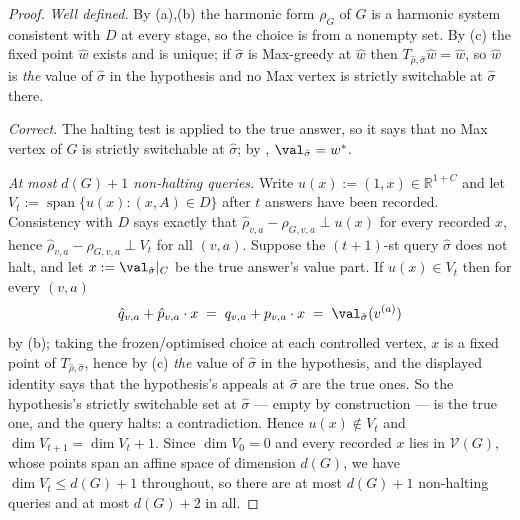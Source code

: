 \begin{proof}
\emph{Well defined.}  By (a),(b) the harmonic form
$\rho_G$ of $G$ is a harmonic system consistent with $D$ at every stage, so
the choice is from a nonempty set.  By (c) the fixed
point $\hat w$ exists and is unique; if $\hat\sigma$ is Max-greedy at
$\hat w$ then $T_{\hat\rho,\hat\sigma}\hat w=\hat w$, so $\hat w$ is
\emph{the} value of $\hat\sigma$ in the hypothesis and no Max vertex is
strictly switchable at $\hat\sigma$ there.

\emph{Correct.}  The halting test is applied to the true answer, so it
says that no Max vertex of $G$ is strictly switchable at $\hat\sigma$;
by , $\val_{\hat\sigma}=w^\ast$.

\emph{At most $d(G)+1$ non-halting queries.}  Write
$u(x):=(1,x)\in\mathbb R^{1+C}$ and let $V_t:=\operatorname{span}\{u(x):(x,A)\in D\}$
after $t$ answers have been recorded.  Consistency with $D$ says exactly
that $\hat\rho_{v,a}-\rho_{G,v,a}\perp u(x)$ for every recorded $x$, hence
$\hat\rho_{v,a}-\rho_{G,v,a}\perp V_t$ for all $(v,a)$.  Suppose the
$(t+1)$-st query $\hat\sigma$ does not halt, and let
$x:=\val_{\hat\sigma}|_C$ be the true answer's value part.  If
$u(x)\in V_t$ then for every $(v,a)$
\[
  \hat q_{v,a}+\hat p_{v,a}\cdot x
  \;=\;q_{v,a}+p_{v,a}\cdot x\;=\;\val_{\hat\sigma}(v^{(a)})
\]
by (b); taking the frozen/optimised choice at each
controlled vertex, $x$ is a fixed point of $T_{\hat\rho,\hat\sigma}$, hence
by (c) \emph{the} value of $\hat\sigma$ in the hypothesis,
and the displayed identity says that the hypothesis's appeals at
$\hat\sigma$ are the true ones.  So the hypothesis's strictly switchable
set at $\hat\sigma$ --- empty by construction --- is the true one, and the
query halts: a contradiction.  Hence $u(x)\notin V_t$ and
$\dim V_{t+1}=\dim V_t+1$.  Since $\dim V_0=0$ and every recorded $x$ lies
in $\mathcal V(G)$, whose points span an affine space of dimension $d(G)$,
we have $\dim V_t\le d(G)+1$ throughout, so there are at most $d(G)+1$
non-halting queries and at most $d(G)+2$ in all.
\end{proof}

